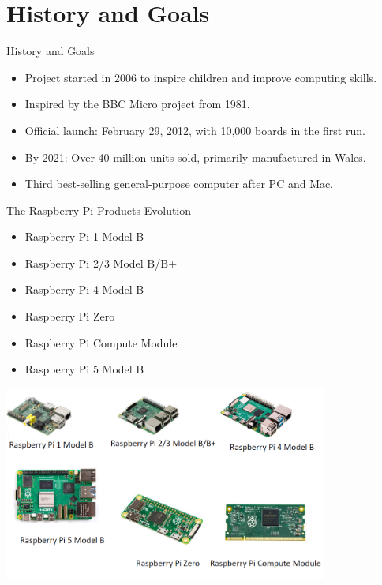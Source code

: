 \section{History and Goals}
\begin{frame}{History and Goals}
  \begin{itemize}
    \item Project started in 2006 to inspire children and improve computing skills.
    \item Inspired by the BBC Micro project from 1981.
    \item Official launch: February 29, 2012, with 10,000 boards in the first run.
    \item By 2021: Over 40 million units sold, primarily manufactured in Wales.
    \item Third best-selling general-purpose computer after PC and Mac.
  \end{itemize}
\end{frame}


\begin{frame}{The Raspberry Pi Products Evolution}
  \begin{itemize}
    \item Raspberry Pi 1 Model B
    \item Raspberry Pi 2/3 Model B/B+
    \item Raspberry Pi 4 Model B
    \item Raspberry Pi Zero
    \item Raspberry Pi Compute Module
    \item Raspberry Pi 5 Model B
  \end{itemize}
  \begin{center}
    \includegraphics[width=0.8\textwidth]{trainingmaterials/rpibasics/evolution.png} 
  \end{center}
\end{frame}


